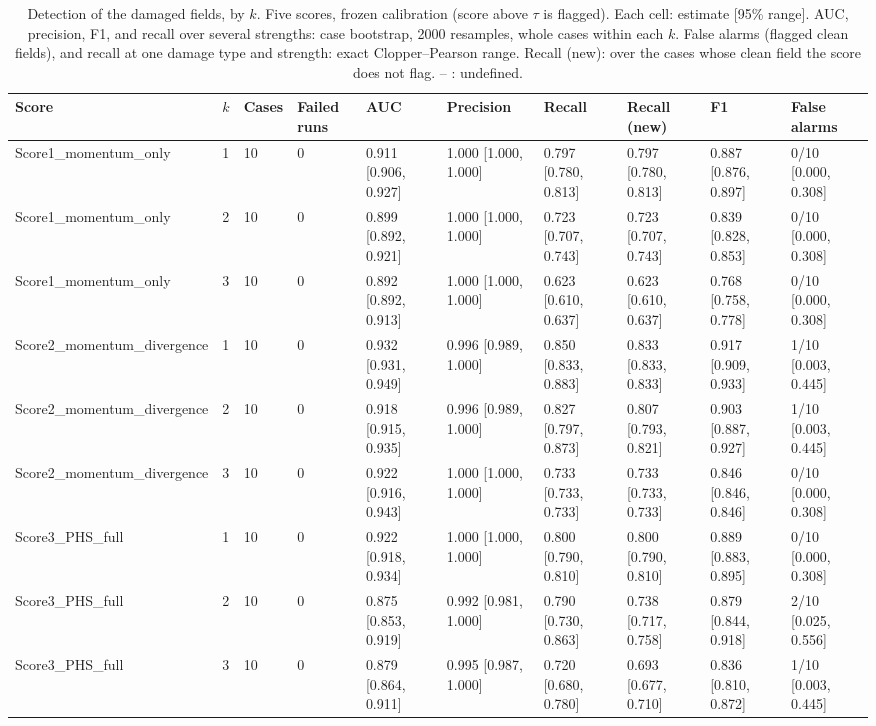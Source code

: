 \begin{table}
\caption{Detection of the damaged fields, by $k$. Five scores, frozen calibration (score above $\tau$ is flagged). Each cell: estimate [95\% range]. AUC, precision, F1, and recall over several strengths: case bootstrap, 2000 resamples, whole cases within each $k$. False alarms (flagged clean fields), and recall at one damage type and strength: exact Clopper--Pearson range. Recall (new): over the cases whose clean field the score does not flag. -- : undefined.}
\label{tab:benchmark_metrics_by_k}
\begin{tabular}{llllllllll}
\toprule
Score & $k$ & Cases & Failed runs & AUC & Precision & Recall & Recall (new) & F1 & False alarms \\
\midrule
Score1\_momentum\_only & 1 & 10 & 0 & 0.911 [0.906, 0.927] & 1.000 [1.000, 1.000] & 0.797 [0.780, 0.813] & 0.797 [0.780, 0.813] & 0.887 [0.876, 0.897] & 0/10 [0.000, 0.308] \\
Score1\_momentum\_only & 2 & 10 & 0 & 0.899 [0.892, 0.921] & 1.000 [1.000, 1.000] & 0.723 [0.707, 0.743] & 0.723 [0.707, 0.743] & 0.839 [0.828, 0.853] & 0/10 [0.000, 0.308] \\
Score1\_momentum\_only & 3 & 10 & 0 & 0.892 [0.892, 0.913] & 1.000 [1.000, 1.000] & 0.623 [0.610, 0.637] & 0.623 [0.610, 0.637] & 0.768 [0.758, 0.778] & 0/10 [0.000, 0.308] \\
Score2\_momentum\_divergence & 1 & 10 & 0 & 0.932 [0.931, 0.949] & 0.996 [0.989, 1.000] & 0.850 [0.833, 0.883] & 0.833 [0.833, 0.833] & 0.917 [0.909, 0.933] & 1/10 [0.003, 0.445] \\
Score2\_momentum\_divergence & 2 & 10 & 0 & 0.918 [0.915, 0.935] & 0.996 [0.989, 1.000] & 0.827 [0.797, 0.873] & 0.807 [0.793, 0.821] & 0.903 [0.887, 0.927] & 1/10 [0.003, 0.445] \\
Score2\_momentum\_divergence & 3 & 10 & 0 & 0.922 [0.916, 0.943] & 1.000 [1.000, 1.000] & 0.733 [0.733, 0.733] & 0.733 [0.733, 0.733] & 0.846 [0.846, 0.846] & 0/10 [0.000, 0.308] \\
Score3\_PHS\_full & 1 & 10 & 0 & 0.922 [0.918, 0.934] & 1.000 [1.000, 1.000] & 0.800 [0.790, 0.810] & 0.800 [0.790, 0.810] & 0.889 [0.883, 0.895] & 0/10 [0.000, 0.308] \\
Score3\_PHS\_full & 2 & 10 & 0 & 0.875 [0.853, 0.919] & 0.992 [0.981, 1.000] & 0.790 [0.730, 0.863] & 0.738 [0.717, 0.758] & 0.879 [0.844, 0.918] & 2/10 [0.025, 0.556] \\
Score3\_PHS\_full & 3 & 10 & 0 & 0.879 [0.864, 0.911] & 0.995 [0.987, 1.000] & 0.720 [0.680, 0.780] & 0.693 [0.677, 0.710] & 0.836 [0.810, 0.872] & 1/10 [0.003, 0.445] \\

\end{tabular}
\end{table}

